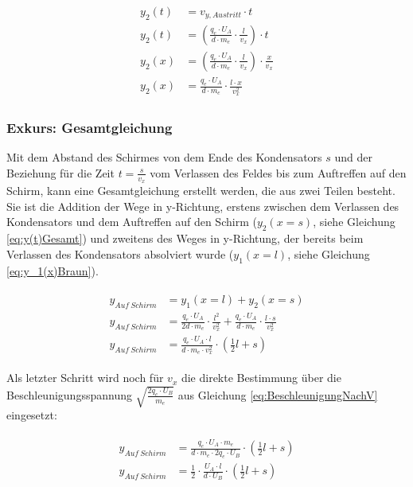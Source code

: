 \begin{align} \label{eq:y(t)Gesamt}
\begin{split}
	y_2(t) &= v_{y,Austritt} \cdot t \\
	y_2(t) &= (\frac{q_e \cdot U_A}{d \cdot m_e} \cdot \frac{l}{v_x}) \cdot t \\
	y_2(x) &= (\frac{q_e \cdot U_A}{d \cdot m_e} \cdot \frac{l}{v_x}) \cdot \frac{x}{v_x} \\
	y_2(x) &= \frac{q_e \cdot U_A}{d \cdot m_e} \cdot \frac{l \cdot x}{v_{x}^2}
\end{split}
\end{align}

\subsubsection{Exkurs: Gesamtgleichung}

\noindent Mit dem Abstand des Schirmes von dem Ende des Kondensators $s$ und der Beziehung für die Zeit $t=\frac{s}{v_x}$ vom Verlassen des Feldes bis zum Auftreffen auf den Schirm, kann eine Gesamtgleichung erstellt werden, die aus zwei Teilen besteht. Sie ist die Addition der Wege in y-Richtung, erstens zwischen dem Verlassen des Kondensators und dem Auftreffen auf den Schirm ($y_2(x=s)$, siehe Gleichung \ref{eq:y(t)Gesamt}) und zweitens des Weges in y-Richtung, der bereits beim Verlassen des Kondensators absolviert wurde ($y_1(x=l)$, siehe Gleichung \ref{eq:y_1(x)Braun}).

\begin{align} \label{eq:yGesamtAnsatz}
\begin{split}
	y_{Auf \ Schirm} &= y_1(x=l) + y_2(x=s) \\
	y_{Auf \ Schirm} &= \frac{q_e \cdot U_A}{2d \cdot m_e} \cdot \frac{l^2}{v_{x}^2}
				      + \frac{q_e \cdot U_A}{d \cdot m_e} \cdot \frac{l \cdot s}{v_{x}^2} \\
	y_{Auf \ Schirm} &= \frac{q_e \cdot U_A \cdot l}{d \cdot m_e \cdot v_{x}^2} \cdot (\frac{1}{2}l + s)
\end{split}
\end{align}

Als letzter Schritt wird noch für $v_{x}$ die direkte Bestimmung über die Beschleunigungsspannung $\sqrt{\frac{2 q_e \cdot U_B}{m_e}}$ aus Gleichung \ref{eq:BeschleunigungNachV} eingesetzt:

\begin{align} \label{eq:yGesamt}
\begin{split}
	y_{Auf \ Schirm} &= \frac{q_e \cdot U_A \cdot m_e}{d \cdot m_e \cdot 2 q_e \cdot U_B} \cdot (\frac{1}{2}l + s) \\
	y_{Auf \ Schirm} &= \frac{1}{2} \cdot \frac{U_A \cdot l}{d \cdot U_B} \cdot (\frac{1}{2}l + s)
\end{split}
\end{align}

